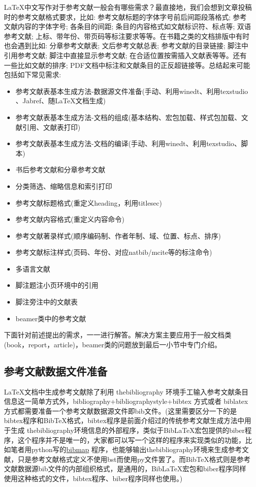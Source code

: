 \documentclass[twoside]{article} %
\begin{document}
\LaTeX 中文写作对于参考文献一般会有哪些需求？最直接地，我们会想到文章投稿时的参考文献格式要求，比如: 参考文献标题的字体字号前后间距段落格式; 参考文献内容的字体字号; 各条目的间距; 条目的内容格式如文献标识符、标点等; 双语参考文献; 上标、带年份、带页码等标注要求等等。在书籍之类的文档排版中有时也会遇到比如: 分章参考文献表; 文后参考文献总表; 参考文献的目录链接; 脚注中引用参考文献; 脚注中直接显示参考文献; 在合适位置按需插入文献表等等。还有一些比如文献的排序; PDF文档中标注和文献条目的正反超链接等。总结起来可能包括如下常见需求:
\begin{itemize}
  \item 参考文献表基本生成方法-数据源文件准备(手动、利用winedt、利用texstudio 、Jabref、随\LaTeX 文档生成)
  \item 参考文献表基本生成方法-文档的组成(基本结构、宏包加载、样式包加载、文献引用、文献表打印)
  \item 参考文献表基本生成方法-文档的编译(手动、利用winedt、利用texstudio、脚本)
  \item 书后参考文献和分章参考文献
  \item 分类筛选、缩略信息和索引打印
  \item 参考文献标题格式(重定义heading，利用titlesec)
  \item 参考文献内容格式(重定义内容命令)
  \item 参考文献著录样式(顺序编码制、作者年制、域、位置、标点、排序)
  \item 参考文献标注样式(页码、年份、对应natbib/mcite等的标注命令)
  \item 多语言文献
  \item 脚注题注小页环境中的引用
  \item 脚注旁注中的文献表
  \item beamer类中的参考文献
\end{itemize}


下面针对前述提出的需求，一一进行解答。解决方案主要应用于一般文档类(book，report，article)，beamer类的问题放到最后一小节中专门介绍。

\subsection{参考文献数据文件准备}\label{sec:bib:file}
\LaTeX 文档中生成参考文献除了利用 thebibliography 环境手工输入参考文献条目信息这一简单方式外，bibliography+bibliographystyle+bibtex 方式或者 biblatex方式都需要准备一个参考文献数据源文件即bib文件。(这里需要区分一下的是bibtex程序和BibTeX格式，bibtex程序是前面介绍过的传统参考文献生成方法中用于生成 thebibliography环境信息的外部程序，类似于BibLaTeX宏包提供的biber程序，这个程序并不是唯一的，大家都可以写一个这样的程序来实现类似的功能，比如笔者用python写的\href{https://github.com/hushidong/biblatex-map}{bibmap} 程序，也能够输出thebibliography环境来生成参考文献，只是参考文献格式定义不使用bst而使用py文件罢了。而BibTeX格式则是参考文献数据源bib文件的内部组织格式，是通用的，BibLaTeX宏包和biber程序同样使用这种格式的文件，bibtex程序、biber程序同样也使用。)
\end{document}
